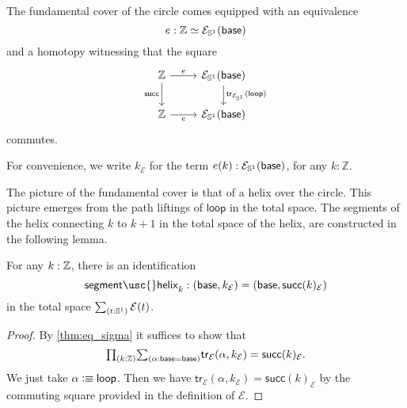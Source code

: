 \begin{rmk}
  The fundamental cover of the circle comes equipped with an equivalence
  \begin{equation*}
    e:\mathbb{Z} \simeq \mathcal{E}_{\mathbb{S}^{1}}(\mathsf{base})
  \end{equation*}
  and a homotopy witnessing that the square
  \begin{equation*}
    \begin{tikzcd}
      \mathbb{Z} \arrow[r,"e"] \arrow[d,swap,"\mathsf{succ}"] & \mathcal{E}_{\sphere{1}}(\mathsf{base}) \arrow[d,"\mathsf{tr}_{\mathcal{E}_{\sphere{1}}}(\mathsf{loop})"] \\
      \mathbb{Z} \arrow[r,swap,"e"] & \mathcal{E}_{\sphere{1}}(\mathsf{base})
    \end{tikzcd}
  \end{equation*}
  commutes.

  For convenience, we write $k_{\mathcal{E}}$ for the term $e(k):\mathcal{E}_{\mathbb{S}^{1}}(\mathsf{base})$, for any $k:\mathbb{Z}$. 
\end{rmk}

The picture of the fundamental cover is that of a helix over the circle. This picture emerges from the path liftings of $\mathsf{loop}$ in the total space. The segments of the helix connecting $k$ to $k+1$ in the total space of the helix, are constructed in the following lemma.

\begin{lem}
For any $k:\mathbb{Z}$, there is an identification
\begin{equation*}
\mathsf{segment\usc{}helix}_k:(\base,k_{\mathcal{E}})=(\base,\mathsf{succ}(k)_{\mathcal{E}})
\end{equation*}
in the total space $\sm{t:\sphere{1}}\mathcal{E}(t)$.
\end{lem}

\begin{proof}
By \cref{thm:eq_sigma} it suffices to show that
\begin{equation*}
\prd{k:\Z} \sm{\alpha:\base=\base} \mathsf{tr}_{\mathcal{E}}(\alpha,k_{\mathcal{E}})= \mathsf{succ}(k)_{\mathcal{E}}.
\end{equation*}
We just take $\alpha\vcentcolon\equiv\mathsf{loop}$. Then we have $\mathsf{tr}_{\mathcal{E}}(\alpha,k_{\mathcal{E}})= \mathsf{succ}(k)_{\mathcal{E}}$ by the commuting square provided in the definition of $\mathcal{E}$.
\end{proof}


